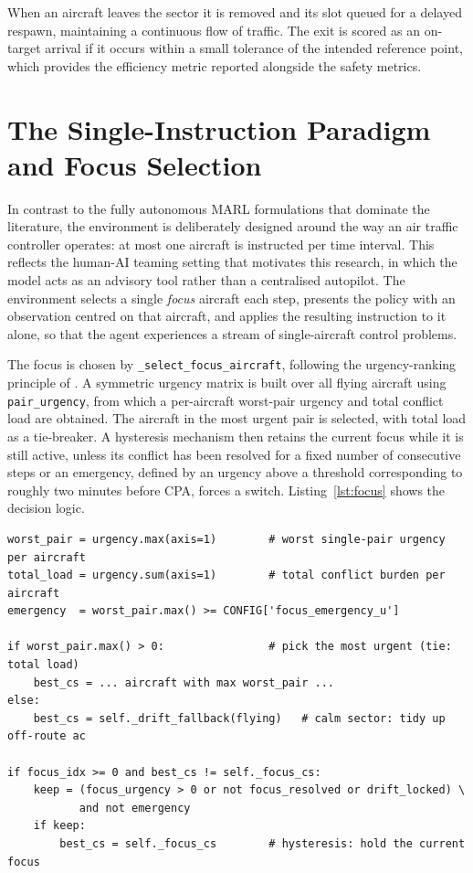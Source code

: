 When an aircraft leaves the sector it is removed and its slot queued for a delayed respawn, maintaining a continuous flow of traffic. The exit is scored as an on-target arrival if it occurs within a small tolerance of the intended reference point, which provides the efficiency metric reported alongside the safety metrics.


\section{The Single-Instruction Paradigm and Focus Selection}
\label{sec:method_paradigm}

In contrast to the fully autonomous MARL formulations that dominate the literature, the environment is deliberately designed around the way an air traffic controller operates: at most one aircraft is instructed per time interval. This reflects the human-AI teaming setting that motivates this research, in which the model acts as an advisory tool rather than a centralised autopilot. The environment selects a single \emph{focus} aircraft each step, presents the policy with an observation centred on that aircraft, and applies the resulting instruction to it alone, so that the agent experiences a stream of single-aircraft control problems.

The focus is chosen by \texttt{\_select\_focus\_aircraft}, following the urgency-ranking principle of \textcite{sui2025}. A symmetric urgency matrix is built over all flying aircraft using \texttt{pair\_urgency}, from which a per-aircraft worst-pair urgency and total conflict load are obtained. The aircraft in the most urgent pair is selected, with total load as a tie-breaker. A hysteresis mechanism then retains the current focus while it is still active, unless its conflict has been resolved for a fixed number of consecutive steps or an emergency, defined by an urgency above a threshold corresponding to roughly two minutes before CPA, forces a switch. Listing~\ref{lst:focus} shows the decision logic.

\begin{lstlisting}[caption={Candidate selection and hysteresis (\texttt{env.py}, abridged).}, label={lst:focus}]
worst_pair = urgency.max(axis=1)        # worst single-pair urgency per aircraft
total_load = urgency.sum(axis=1)        # total conflict burden per aircraft
emergency  = worst_pair.max() >= CONFIG['focus_emergency_u']

if worst_pair.max() > 0:                # pick the most urgent (tie: total load)
    best_cs = ... aircraft with max worst_pair ...
else:
    best_cs = self._drift_fallback(flying)   # calm sector: tidy up off-route ac

if focus_idx >= 0 and best_cs != self._focus_cs:
    keep = (focus_urgency > 0 or not focus_resolved or drift_locked) \
           and not emergency
    if keep:
        best_cs = self._focus_cs        # hysteresis: hold the current focus
\end{lstlisting}

